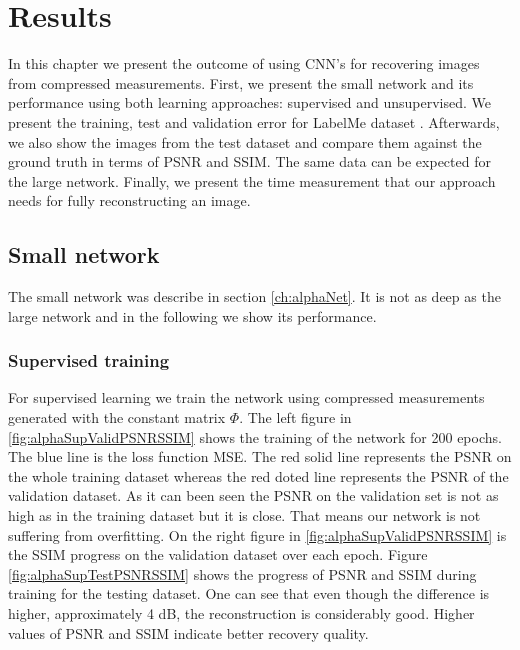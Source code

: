 \chapter{Results}
In this chapter we present the outcome of using CNN's for recovering images from compressed measurements. First, we present the small network and its performance using both learning approaches: supervised and unsupervised. We present the training, test and validation error for LabelMe dataset \cite{LFWTech}. Afterwards, we also show the images from the test dataset and compare them against the ground truth in terms of PSNR and SSIM. The same data can be expected for the large network. Finally, we present the time measurement that our approach needs for fully reconstructing an image.  

\section{Small network}
The small network was describe in section \ref{ch:alphaNet}. It is not as deep as the large network and in the following we show its performance.
\subsection{Supervised training}
For supervised learning we train the network using compressed measurements generated with the constant matrix $\Phi$. The left figure in \ref{fig:alphaSupValidPSNRSSIM} shows the training of the network for 200 epochs. The blue line is the loss function MSE. The red solid line represents the PSNR on the whole training dataset whereas the red doted line represents the PSNR of the validation dataset. As it can been seen the PSNR on the validation set is not as high as in the training dataset but it is close. That means our network is not suffering from overfitting. On the right figure in \ref{fig:alphaSupValidPSNRSSIM} is the SSIM progress on the validation dataset over each epoch. Figure \ref{fig:alphaSupTestPSNRSSIM} shows the progress of PSNR and SSIM during training for the testing dataset. One can see that even though the difference is higher, approximately 4 dB, the reconstruction is considerably good. Higher values of PSNR and SSIM indicate better recovery quality. 
 

